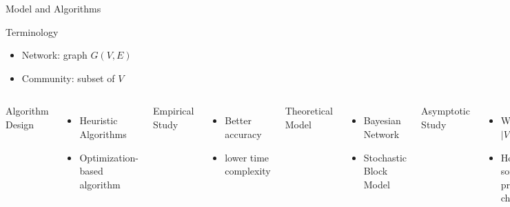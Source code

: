 \documentclass[notheorems]{beamer}
\begin{document}
\begin{frame}{Model and Algorithms}
	\begin{block}{Terminology}
		\begin{itemize}
			\item Network: graph $G(V, E)$
			\item Community: subset of $V$
		\end{itemize}		
	\end{block}
	\vskip 0.5cm
	\begin{columns}
		Algorithm Design
		\begin{itemize}
			\item Heuristic Algorithms
			\item Optimization-based algorithm
		\end{itemize}
		Empirical Study
		\begin{itemize}
			\item Better accuracy
			\item lower time complexity
		\end{itemize}
		Theoretical Model
		\begin{itemize}
			\item Bayesian Network
			\item Stochastic Block Model
		\end{itemize}
		Asymptotic Study
		\begin{itemize}
			\item When $|V|\to \infty$
			\item How some property changes
		\end{itemize}
	\end{columns}
\end{frame}
\end{document}
